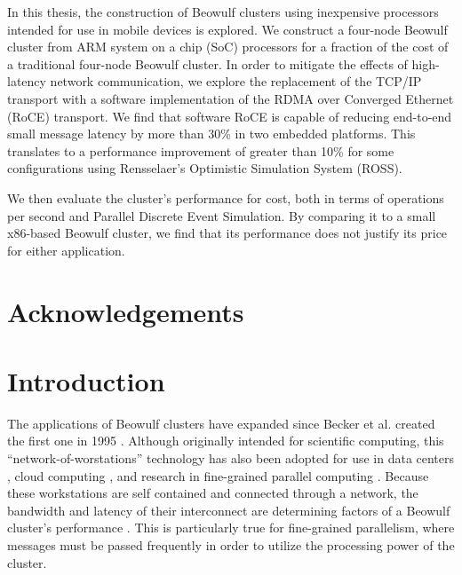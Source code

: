 \documentclass[11pt]{book}
\begin{document}
In this thesis, the construction of Beowulf clusters using inexpensive
processors intended for use in mobile devices is explored. We construct a
four-node Beowulf cluster from ARM system on a chip (SoC) processors for a
fraction of the cost of a traditional four-node Beowulf cluster. In order to
mitigate the effects of high-latency network communication, we explore the
replacement of the TCP/IP transport with a software implementation of the RDMA
over Converged Ethernet (RoCE) transport. We find that software RoCE is capable
of reducing end-to-end small message latency by more than 30\% in two embedded
platforms. This translates to a performance improvement of greater than 10\% for
some configurations using Rensselaer's Optimistic Simulation System (ROSS).

We then evaluate the cluster's performance for cost, both in terms of operations
per second and Parallel Discrete Event Simulation. By comparing it to a small
x86-based Beowulf cluster, we find that its performance does not justify its
price for either application.

\chapter*{Acknowledgements}


\tableofcontents \markright{ }
\listoffigures \markright{ }
\listoftables \markright{ }

\clearpage
{}
\setcounter{page}{1}

\chapter{Introduction}
\label{introduction}

The applications of Beowulf clusters have expanded since Becker et al. created
the first one in 1995 \cite{becker-95}. Although originally intended for
scientific computing, this ``network-of-worstations'' technology has also been
adopted for use in data centers \cite{liu-13}, cloud computing
\cite{trivedi-11}, and research in fine-grained parallel computing
\cite{aad-03}. Because these workstations are self contained and connected
through a network, the bandwidth and latency of their interconnect are
determining factors of a Beowulf cluster's performance \cite{lancaster-10}
\cite{becker-95}. This is particularly true for fine-grained parallelism, where
messages must be passed frequently in order to utilize the processing power of
the cluster.
\end{document}
